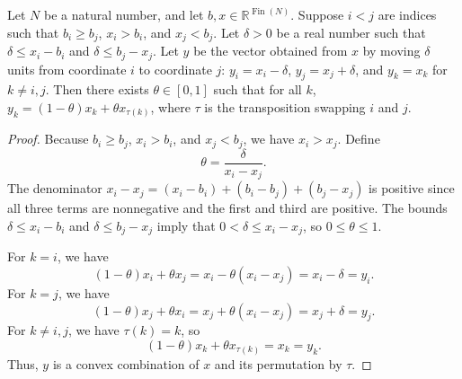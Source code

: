 \begin{helper}
Let \(N\) be a natural number, and let \(b, x \in \mathbb R^{\operatorname{Fin}(N)}\). Suppose \(i < j\) are indices such that \(b_i \ge b_j\), \(x_i > b_i\), and \(x_j < b_j\). Let \(\delta > 0\) be a real number such that \(\delta \le x_i - b_i\) and \(\delta \le b_j - x_j\). Let \(y\) be the vector obtained from \(x\) by moving \(\delta\) units from coordinate \(i\) to coordinate \(j\): \(y_i = x_i - \delta\), \(y_j = x_j + \delta\), and \(y_k = x_k\) for \(k \neq i, j\). Then there exists \(\theta \in [0, 1]\) such that for all \(k\), \(y_k = (1 - \theta) x_k + \theta x_{\tau(k)}\), where \(\tau\) is the transposition swapping \(i\) and \(j\).
\end{helper}
\begin{proof}
Because \(b_i \ge b_j\), \(x_i > b_i\), and \(x_j < b_j\), we have \(x_i > x_j\). Define
\[
\theta = \frac{\delta}{x_i - x_j}.
\]
The denominator \(x_i - x_j = (x_i - b_i) + (b_i - b_j) + (b_j - x_j)\) is positive since all three terms are nonnegative and the first and third are positive. The bounds \(\delta \le x_i - b_i\) and \(\delta \le b_j - x_j\) imply that \(0 < \delta \le x_i - x_j\), so \(0 \le \theta \le 1\).

For \(k = i\), we have
\[
(1 - \theta) x_i + \theta x_j = x_i - \theta(x_i - x_j) = x_i - \delta = y_i.
\]
For \(k = j\), we have
\[
(1 - \theta) x_j + \theta x_i = x_j + \theta(x_i - x_j) = x_j + \delta = y_j.
\]
For \(k \neq i, j\), we have \(\tau(k) = k\), so
\[
(1 - \theta) x_k + \theta x_{\tau(k)} = x_k = y_k.
\]
Thus, \(y\) is a convex combination of \(x\) and its permutation by \(\tau\).
\end{proof}

